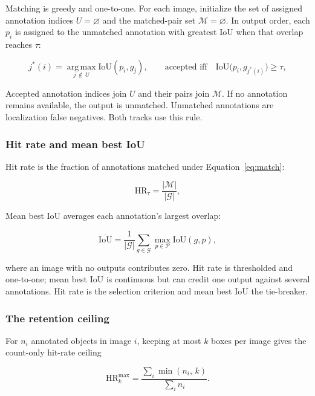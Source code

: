 \documentclass[a4paper,8pt]{article}
\begin{document}
Matching is greedy and one-to-one. For each image, initialize the set of assigned annotation
indices $U=\varnothing$ and the matched-pair set $\mathcal{M}=\varnothing$. In output order,
each $p_i$ is assigned to the unmatched
annotation with greatest IoU when that overlap reaches $\tau$:

\begin{equation}
j^{*}(i) = \operatorname*{arg\,max}_{j \,\notin\, U} \mathrm{IoU}(p_i, g_j),
\qquad\text{accepted iff}\quad \mathrm{IoU}\bigl(p_i, g_{j^{*}(i)}\bigr) \ge \tau ,
\label{eq:match}
\end{equation}

Accepted annotation indices join $U$ and their pairs join $\mathcal{M}$. If no annotation
remains available, the output is unmatched. Unmatched annotations are localization false
negatives. Both tracks use this rule.

\subsubsection{Hit rate and mean best IoU}

Hit rate is the fraction of annotations matched under Equation~\eqref{eq:match}:

\begin{equation}
\mathrm{HR}_\tau = \frac{|\mathcal{M}|}{|\mathcal{G}|},
\label{eq:hitrate}
\end{equation}

Mean best IoU averages each annotation's largest overlap:

\begin{equation}
\overline{\mathrm{IoU}} = \frac{1}{|\mathcal{G}|}
\sum_{g \in \mathcal{G}} \max_{p \in \mathcal{P}} \mathrm{IoU}(g, p),
\label{eq:meaniou}
\end{equation}

where an image with no outputs contributes zero. Hit rate is thresholded and one-to-one; mean
best IoU is continuous but can credit one output against several annotations. Hit rate is the
selection criterion and mean best IoU the tie-breaker.

\subsubsection{The retention ceiling}

For $n_i$ annotated objects in image $i$, keeping at most $k$ boxes per image gives the
count-only hit-rate ceiling

\begin{equation}
\mathrm{HR}^{\max}_{k} = \frac{\sum_i \min(n_i,\, k)}{\sum_i n_i}.
\label{eq:ceiling}
\end{equation}
\end{document}

